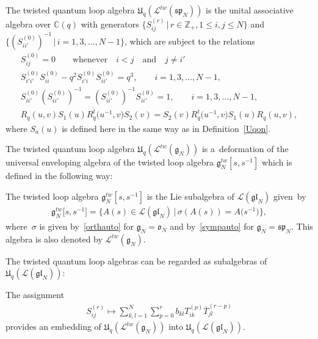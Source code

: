 \begin{definition}
The twisted quantum loop algebra $\mathfrak{U}_q(\mathcal{L}^{tw}(\mathfrak{sp}_N))$ is the unital associative algebra
over $\mathbb{C}(q)$ with generators $\big\{S_{ij}^{(r)} \,|\, r \in \mathbb{Z}_+, 1 \leq i, j \leq N\big\}$ and
$\big\{(S_{ii'}^{(0)})^{-1} \,|\, i=1,3,\ldots,N{-}1\big\}$, which are subject to the relations
\begin{gather*}
S_{ij}^{(0)}=0 \qquad \text{whenever} \quad i<j \quad \text{and} \quad j \neq i'
\\
S_{i'i'}^{(0)}S_{ii}^{(0)}-q^2S_{i'i}^{(0)}S_{ii'}^{(0)}=q^3, \qquad i=1, 3, \ldots, N-1,
\\
S_{ii'}^{(0)}(S_{ii'}^{(0)})^{-1}=(S_{ii'}^{(0)})^{-1}S_{ii'}^{(0)}=1, \qquad i=1, 3, \ldots, N-1,
\\
R_q(u,v)S_1(u)R_q^t\big(u^{-1},v\big)S_2(v)=S_2(v)R_q^t\big(u^{-1},v\big)S_1(u)R_q(u,v),
\end{gather*}
where $S_a(u)$ is def\/ined here in the same way as in Def\/inition~\ref{Uqon}.
\end{definition}

The twisted quantum loop algebra $\mathfrak{U}_q(\mathcal{L}^{tw}(\mathfrak{g}_N))$ is a~deformation of the universal
enveloping algebra of the twisted loop algebra $\mathfrak{g}_N^{tw}[s,s^{-1}]$ which is def\/ined in the following way:

\begin{definition}
The twisted loop algebra $\mathfrak{g}_N^{tw}[s,s^{-1}]$ is the Lie subalgebra of
$\mathcal{L}(\mathfrak{gl}_N)$ given~by
\begin{gather*}
\mathfrak{g}_N^{tw}\big[s,s^{-1}\big]=\big\{A(s) \in \mathcal{L}(\mathfrak{gl}_N) \,|\, \sigma(A(s))=A\big(s^{-1}\big)\big\},
\end{gather*}
where~$\sigma$ is given by~\eqref{orthauto} for $\mathfrak{g}_N=\mathfrak{o}_N$ and by~\eqref{sympauto} for
$\mathfrak{g}_N=\mathfrak{sp}_N$.
This algebra is also denoted by $\mathcal{L}^{tw}(\mathfrak{g}_N)$.
\end{definition}

The twisted quantum loop algebras can be regarded as subalgebras of
$\mathfrak{U}_q(\mathcal{L}(\mathfrak{gl}_N))$:

\begin{proposition}\label{embU}
The assignment
\begin{gather*}
S_{ij}^{(r)} \mapsto \sum\limits_{k,l=1}^N \sum\limits_{p=0}^r b_{kl} T_{ik}^{(p)} \overline{T}_{jl}^{(r-p)}
\end{gather*}
provides an embedding of $\mathfrak{U}_q(\mathcal{L}^{tw}(\mathfrak{g}_N))$ into
$\mathfrak{U}_q(\mathcal{L}(\mathfrak{gl}_N))$.
\end{proposition}

